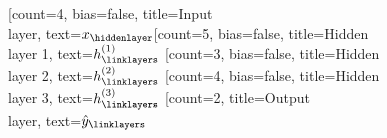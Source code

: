 \documentclass{standalone}
\begin{document}
    \begin{neuralnetwork}[height=5]
        \newcommand{\x}[2]{$x_#2$}
        \newcommand{\y}[2]{$\hat{y}_#2$}
        \newcommand{\hfirst}[2]{\small $h^{(1)}_#2$}
        \newcommand{\hsecond}[2]{\small $h^{(2)}_#2$}
        \newcommand{\hthird}[2]{\small $h^{(3)}_#2$}
        [count=4, bias=false, title=Input\\layer, text=\x]
        \hiddenlayer[count=5, bias=false, title=Hidden\\layer 1, text=\hfirst] \linklayers
        \hiddenlayer[count=3, bias=false, title=Hidden\\layer 2, text=\hsecond] \linklayers
        \hiddenlayer[count=4, bias=false, title=Hidden\\layer 3, text=\hthird] \linklayers
        \outputlayer[count=2, title=Output\\layer, text=\y] \linklayers
    \end{neuralnetwork}
\end{document}
